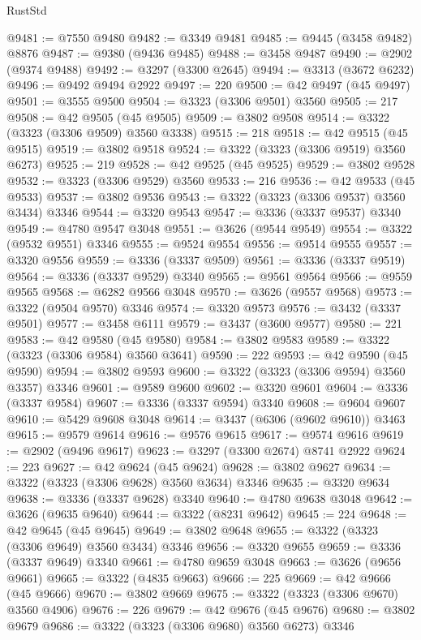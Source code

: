 \begin{lexlean}{RustStd}
\begin{coremodule}
@9481 := @7550 @9480
@9482 := @3349 @9481
@9485 := @9445 (@3458 @9482) @8876
@9487 := @9380 (@9436 @9485)
@9488 := @3458 @9487
@9490 := @2902 (@9374 @9488)
@9492 := @3297 (@3300 @2645)
@9494 := @3313 (@3672 @6232)
@9496 := @9492 @9494 @2922
@9497 := 220
@9500 := @42 @9497 (@45 @9497)
@9501 := @3555 @9500
@9504 := @3323 (@3306 @9501) @3560
@9505 := 217
@9508 := @42 @9505 (@45 @9505)
@9509 := @3802 @9508
@9514 := @3322 (@3323 (@3306 @9509) @3560 @3338)
@9515 := 218
@9518 := @42 @9515 (@45 @9515)
@9519 := @3802 @9518
@9524 := @3322 (@3323 (@3306 @9519) @3560 @6273)
@9525 := 219
@9528 := @42 @9525 (@45 @9525)
@9529 := @3802 @9528
@9532 := @3323 (@3306 @9529) @3560
@9533 := 216
@9536 := @42 @9533 (@45 @9533)
@9537 := @3802 @9536
@9543 := @3322 (@3323 (@3306 @9537) @3560 @3434) @3346
@9544 := @3320 @9543
@9547 := @3336 (@3337 @9537) @3340
@9549 := @4780 @9547 @3048
@9551 := @3626 (@9544 @9549)
@9554 := @3322 (@9532 @9551) @3346
@9555 := @9524 @9554
@9556 := @9514 @9555
@9557 := @3320 @9556
@9559 := @3336 (@3337 @9509)
@9561 := @3336 (@3337 @9519)
@9564 := @3336 (@3337 @9529) @3340
@9565 := @9561 @9564
@9566 := @9559 @9565
@9568 := @6282 @9566 @3048
@9570 := @3626 (@9557 @9568)
@9573 := @3322 (@9504 @9570) @3346
@9574 := @3320 @9573
@9576 := @3432 (@3337 @9501)
@9577 := @3458 @6111
@9579 := @3437 (@3600 @9577)
@9580 := 221
@9583 := @42 @9580 (@45 @9580)
@9584 := @3802 @9583
@9589 := @3322 (@3323 (@3306 @9584) @3560 @3641)
@9590 := 222
@9593 := @42 @9590 (@45 @9590)
@9594 := @3802 @9593
@9600 := @3322 (@3323 (@3306 @9594) @3560 @3357) @3346
@9601 := @9589 @9600
@9602 := @3320 @9601
@9604 := @3336 (@3337 @9584)
@9607 := @3336 (@3337 @9594) @3340
@9608 := @9604 @9607
@9610 := @5429 @9608 @3048
@9614 := @3437 (@6306 (@9602 @9610)) @3463
@9615 := @9579 @9614
@9616 := @9576 @9615
@9617 := @9574 @9616
@9619 := @2902 (@9496 @9617)
@9623 := @3297 (@3300 @2674) @8741 @2922
@9624 := 223
@9627 := @42 @9624 (@45 @9624)
@9628 := @3802 @9627
@9634 := @3322 (@3323 (@3306 @9628) @3560 @3634) @3346
@9635 := @3320 @9634
@9638 := @3336 (@3337 @9628) @3340
@9640 := @4780 @9638 @3048
@9642 := @3626 (@9635 @9640)
@9644 := @3322 (@8231 @9642)
@9645 := 224
@9648 := @42 @9645 (@45 @9645)
@9649 := @3802 @9648
@9655 := @3322 (@3323 (@3306 @9649) @3560 @3434) @3346
@9656 := @3320 @9655
@9659 := @3336 (@3337 @9649) @3340
@9661 := @4780 @9659 @3048
@9663 := @3626 (@9656 @9661)
@9665 := @3322 (@4835 @9663)
@9666 := 225
@9669 := @42 @9666 (@45 @9666)
@9670 := @3802 @9669
@9675 := @3322 (@3323 (@3306 @9670) @3560 @4906)
@9676 := 226
@9679 := @42 @9676 (@45 @9676)
@9680 := @3802 @9679
@9686 := @3322 (@3323 (@3306 @9680) @3560 @6273) @3346

\end{coremodule}
\end{lexlean}
